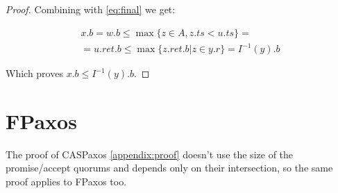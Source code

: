 \documentclass[a4paper,USenglish]{lipics-v2018}
\theoremstyle{definition}
\begin{document}
\begin{appendices}
\begin{proof}
            Combining with \ref{eq:final} we get:
          
            \begin{multline}
                x.b = w.b \leq \max \{ z \in A, z.ts < u.ts \} = \\
                = u.ret.b \leq \max \{ z.ret.b | z \in y.r \} = I^{-1}(y).b
            \end{multline}
          
            Which proves $x.b \leq I^{-1}(y).b$.
          
        \end{proof}
        
        \section{FPaxos}
        \label{appendix:fpaxos}

        The proof of CASPaxos \ref{appendix:proof} doesn't use the size of the promise/accept quorums and depends only on their intersection, so the same proof applies to FPaxos too.
            
    \end{appendices}
\end{document}
